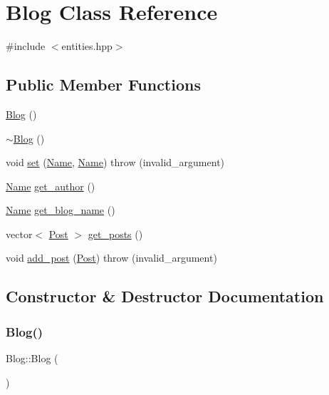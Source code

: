 \hypertarget{class_blog}{}\section{Blog Class Reference}
\label{class_blog}


{\ttfamily \#include $<$entities.\+hpp$>$}

\subsection*{Public Member Functions}
\begin{DoxyCompactItemize}
\item 
\hyperlink{class_blog_ab63cb2f696877f200bb482f393c9b1f1}{Blog} ()
\item 
\hyperlink{class_blog_a0b2c662d24dee57b9b897e9aaef74233}{$\sim$\+Blog} ()
\item 
void \hyperlink{class_blog_a68d4c09dcba38658631dbec6d8eb0872}{set} (\hyperlink{class_name}{Name}, \hyperlink{class_name}{Name})  throw (invalid\+\_\+argument)
\item 
\hyperlink{class_name}{Name} \hyperlink{class_blog_a794238dfa9289de8bd7d9e4d811c85b7}{get\+\_\+author} ()
\item 
\hyperlink{class_name}{Name} \hyperlink{class_blog_a45fed99771b904d4a9eaa3846f24f0b0}{get\+\_\+blog\+\_\+name} ()
\item 
vector$<$ \hyperlink{class_post}{Post} $>$ \hyperlink{class_blog_a5143eadadb62ee67205e5ee6665165a5}{get\+\_\+posts} ()
\item 
void \hyperlink{class_blog_a5299f1a5721555bdb6f9af07df9def41}{add\+\_\+post} (\hyperlink{class_post}{Post})  throw (invalid\+\_\+argument)
\end{DoxyCompactItemize}


\subsection{Constructor \& Destructor Documentation}
\mbox{\label{class_blog_ab63cb2f696877f200bb482f393c9b1f1}} 
\subsubsection{\texorpdfstring{Blog()}{Blog()}}
{\footnotesize\ttfamily Blog\+::\+Blog (\begin{DoxyParamCaption}{ }\end{DoxyParamCaption})}

